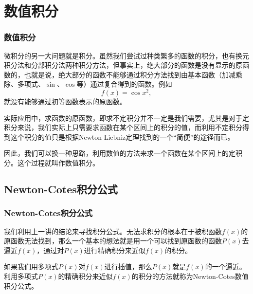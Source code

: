 \documentclass[10pt]{beamer}
\begin{document}



\section{数值积分}


\begin{frame}
\frametitle{数值积分}
微积分的另一大问题就是积分。虽然我们尝试过种类繁多的函数的积分，也有换元积分法和分部积分法两种积分方法，但事实上，绝大部分的函数是没有显示的原函数的，也就是说，绝大部分的函数不能够通过积分方法找到由基本函数（加减乘除、多项式、$\sin$、$\cos$等）通过复合得到的函数。例如
\begin{equation}
f(x) = \cos x^2,
\end{equation}
就没有能够通过初等函数表示的原函数。

\vspace{0.2cm}

实际应用中，求函数的原函数，即求不定积分并不一定是我们需要，尤其是对于定积分来说，我们实际上只需要求函数在某个区间上的积分的值，而利用不定积分得到这个积分的值只是根据Newton-Liebniz定理找到的一个“简便”的途径而已。

\vspace{0.2cm}

因此，我们可以换一种思路，利用数值的方法来求一个函数在某个区间上的定积分。这个过程就叫作数值积分。
\end{frame}


\subsection{Newton-Cotes积分公式}

\begin{frame}
\frametitle{Newton-Cotes积分公式}
我们利用上一讲的结论来寻找积分公式。无法求积分的根本在于被积函数$f(x)$的原函数无法找到，那么一个基本的想法就是用一个可以找到原函数的函数$P(x)$去逼近$f(x)$，通过对$P(x)$进行精确积分来近似$f(x)$的积分。

\vspace{0.2cm}

如果我们用多项式$P(x)$对$f(x)$进行插值，那么$P(x)$就是$f(x)$的一个逼近。利用多项式$P(x)$的精确积分来近似$f(x)$的积分的方法就称为Newton-Cotes数值积分公式。
\end{frame}
\end{document}
